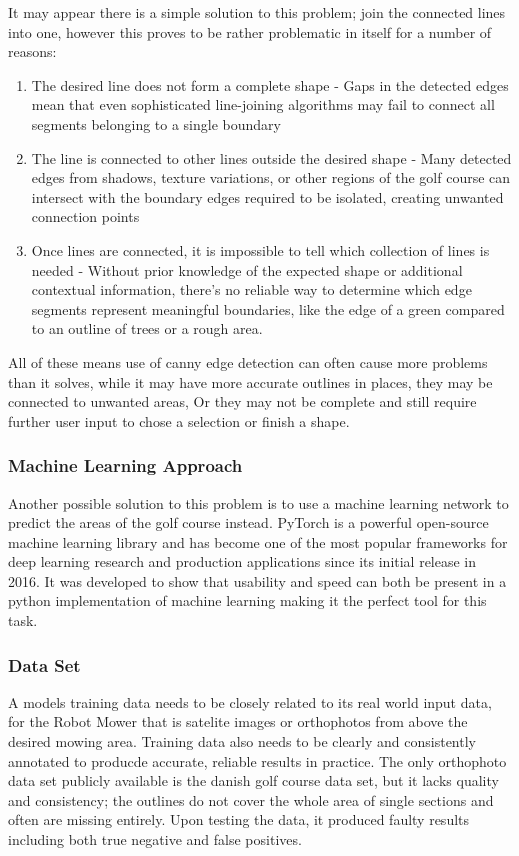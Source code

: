 \documentclass[final]{cmpreport_02}
\begin{document}
It may appear there is a simple solution to this problem; join the connected lines into one, however this proves to be rather problematic in itself for a number of reasons:

\begin{enumerate}
	\item The desired line does not form a complete shape - Gaps in the detected edges mean that even sophisticated line-joining algorithms may fail to connect all segments belonging to a single boundary

	\item The line is connected to other lines outside the desired shape - Many detected edges from shadows, texture variations, or other regions of the golf course can intersect with the boundary edges required to be isolated, creating unwanted connection points

	\item Once lines are connected, it is impossible to tell which collection of lines is needed - Without prior knowledge of the expected shape or additional contextual information, there's no reliable way to determine which edge segments represent meaningful boundaries, like the edge of a green compared to an outline of trees or a rough area.
\end{enumerate}
All of these means use of canny edge detection can often cause more problems than it solves, while it may have more accurate outlines in places, they may be connected to unwanted areas, Or they may not be complete and still require further user input to chose a selection or finish a shape.

\subsubsection{Machine Learning Approach}
Another possible solution to this problem is to use a machine learning network to predict the areas of the golf course instead.
PyTorch \citep{paszke2019pytorch} is a powerful open-source machine learning library and has become one of the most popular frameworks for deep learning research and production applications since its initial release in 2016.
It was developed to show that usability and speed can both be present in a python implementation of machine learning making it the perfect tool for this task.

\subsubsection{Data Set}
A models training data needs to be closely related to its real world input data, for the Robot Mower that is satelite images or orthophotos from above the desired mowing area.
Training data also needs to be clearly and consistently annotated to producde accurate, reliable results in practice.
The only orthophoto data set publicly available is the danish golf course data set, but it lacks quality and consistency; the outlines do not cover the whole area of single sections and often are missing entirely.
Upon testing the data, it produced faulty results including both true negative and false positives. ~
\end{document}
